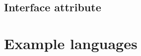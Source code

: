 		\subsection{Interface attribute} \label{s:interface-viewpoint-template:interface-attribute}
			\begin{comment}
				A description of how other entities interact with this entity. The interface attribute describes the methods of
				interaction and the rules governing those interactions. Methods of interaction include the mechanisms for
				invoking or interrupting the entity, for communicating through parameters, common data areas or
				messages, and for direct access to internal data. The rules governing the interaction include the
				communications protocol, data format, acceptable values, and the meaning of each value.
				
				This attribute provides a description of the input ranges, the meaning of inputs and outputs, the type and
				format of each input or output, and output error codes. For information systems, it should include inputs,
				screen formats, and a complete description of the interactive language.
				
				NOTE—This design attribute is retained for compatibility with IEEE Std 1016-1998
			\end{comment}
			
	\section{Example languages} \label{s:interface-viewpoint-template:example-languages}
		\begin{comment}
			Interface definition languages (IDL), UML component diagram (OMG [B28]). In case of user interfaces
			the Interface view should include screen formats, valid inputs, and resulting outputs. For data-driven
			entities, a data dictionary should be used to describe the data characteristics. Those entities that are highly
			visible to a user and involve the details of how the customer should perceive the system should include a
			functional model, scenarios for use, detailed feature sets, and the interaction language.
		\end{comment}